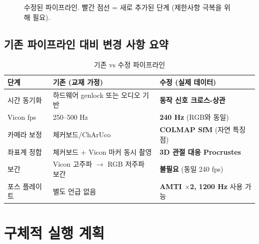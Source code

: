 \documentclass[11pt, a4paper]{report}
\begin{document}
\begin{figure}[H]
\caption{수정된 파이프라인. 빨간 점선 = 새로 추가된 단계 (제한사항 극복을 위해 필요).}
\label{fig:revised_pipeline}
\end{figure}


\section{기존 파이프라인 대비 변경 사항 요약}

\begin{table}[H]
\centering
\caption{기존 vs 수정 파이프라인}
\label{tab:pipeline_diff}
\renewcommand{\arraystretch}{1.3}
\begin{tabularx}{\textwidth}{lXX}
\toprule
\textbf{단계} & \textbf{기존 (교재 가정)} & \textbf{수정 (실제 데이터)} \\
\midrule
시간 동기화 & 하드웨어 genlock 또는 오디오 기반 & \textbf{동작 신호 크로스-상관} \\
\addlinespace
Vicon fps & 250--500 Hz & \textbf{240 Hz} (RGB와 동일) \\
\addlinespace
카메라 보정 & 체커보드/ChArUco & \textbf{COLMAP SfM} (자연 특징점) \\
\addlinespace
좌표계 정합 & 체커보드 + Vicon 마커 동시 촬영 & \textbf{3D 관절 대응 Procrustes} \\
\addlinespace
보간 & Vicon 고주파 $\rightarrow$ RGB 저주파 보간 & \textbf{불필요} (동일 240 fps) \\
\addlinespace
포스 플레이트 & 별도 언급 없음 & \textbf{AMTI $\times$2, 1200 Hz} 사용 가능 \\
\bottomrule
\end{tabularx}
\end{table}


\chapter{구체적 실행 계획}
\label{ch:execution}
\end{document}
